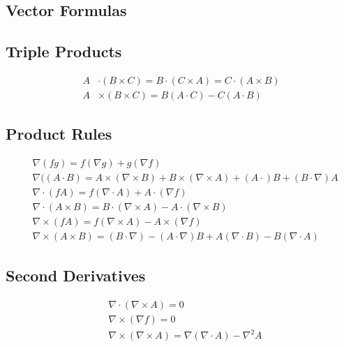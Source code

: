 \documentclass[a4paper, 11pt, landscape]{article}
\begin{document}
\setlength{\abovedisplayskip}{0pt}
\setlength{\belowdisplayskip}{0pt}
\setlength{\abovedisplayshortskip}{0pt}
\setlength{\belowdisplayshortskip}{0pt}

\begin{multicols*}{3}

\section{Vector Formulas}
\subsection{Triple Products}
\begin{compactenum}
    \begin{align*}
        A &\cdot (B \times C) = B \cdot (C \times A) = C \cdot (A \times B )\\
        A &\times (B \times C) = B(A \cdot C) - C(A \cdot B)
    \end{align*}
\end{compactenum}

\subsection{Product Rules}
\begin{compactenum}
    \begin{align*}
    &\nabla(fg) = f(\nabla g) + g(\nabla f) \\
    &\nabla((A \cdot B) = A \times (\nabla \times B) + B \times (\nabla \times A) + (A \cdot)B + (B \cdot \nabla)A\\
    &\nabla \cdot(fA) = f(\nabla \cdot A) + A \cdot (\nabla f) \\
    &\nabla \cdot (A \times B) = B \cdot (\nabla \times A) - A \cdot (\nabla \times B) \\
    &\nabla \times (fA) = f(\nabla \times A) - A \times (\nabla f) \\
    &\nabla \times (A \times B) = (B \cdot \nabla) - (A \cdot \nabla)B + A(\nabla \cdot B) - B(\nabla \cdot A)
    \end{align*}
\end{compactenum}

\subsection{Second Derivatives}
\begin{compactenum}
    \begin{align*}
    &\nabla \cdot (\nabla \times A) = 0 \\
    &\nabla \times (\nabla f) = 0 \\
    &\nabla \times (\nabla \times A) = \nabla(\nabla \cdot A) - \nabla^{2}A
    \end{align*}
\end{compactenum}


\end{multicols*}
\end{document}
